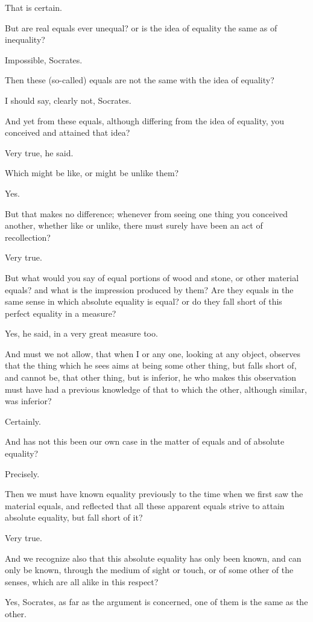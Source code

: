 That is certain.

But are real equals ever unequal? or is the idea of equality the same as
of inequality?

Impossible, Socrates.

Then these (so-called) equals are not the same with the idea of
equality?

I should say, clearly not, Socrates.

And yet from these equals, although differing from the idea of equality,
you conceived and attained that idea?

Very true, he said.

Which might be like, or might be unlike them?

Yes.

But that makes no difference; whenever from seeing one thing you
conceived another, whether like or unlike, there must surely have been
an act of recollection?

Very true.

But what would you say of equal portions of wood and stone, or other
material equals? and what is the impression produced by them? Are they
equals in the same sense in which absolute equality is equal? or do they
fall short of this perfect equality in a measure?

Yes, he said, in a very great measure too.

And must we not allow, that when I or any one, looking at any object,
observes that the thing which he sees aims at being some other thing,
but falls short of, and cannot be, that other thing, but is inferior, he
who makes this observation must have had a previous knowledge of that to
which the other, although similar, was inferior?

Certainly.

And has not this been our own case in the matter of equals and of
absolute equality?

Precisely.

Then we must have known equality previously to the time when we first
saw the material equals, and reflected that all these apparent equals
strive to attain absolute equality, but fall short of it?

Very true.

And we recognize also that this absolute equality has only been known,
and can only be known, through the medium of sight or touch, or of some
other of the senses, which are all alike in this respect?

Yes, Socrates, as far as the argument is concerned, one of them is the
same as the other.

